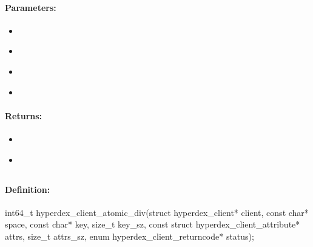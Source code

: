 \paragraph{Parameters:}
\begin{itemize}[noitemsep]
\item {}\\

\item {}\\

\item {}\\

\item {}\\

\end{itemize}

\paragraph{Returns:}
\begin{itemize}[noitemsep]
\item {}\\

\item {}\\

\end{itemize}

\pagebreak
\subsection{}
\label{api:c:atomic_div}


\paragraph{Definition:}
\begin{ccode}
int64_t hyperdex_client_atomic_div(struct hyperdex_client* client,
        const char* space,
        const char* key, size_t key_sz,
        const struct hyperdex_client_attribute* attrs, size_t attrs_sz,
        enum hyperdex_client_returncode* status);
\end{ccode}

